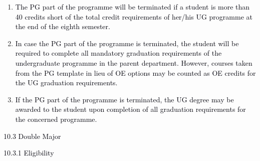 \documentclass[12pt]{article}
\begin{document}
\vspace{\baselineskip}
\begin{enumerate}
	\item {\fontsize{10pt}{12.0pt}\selectfont \textcolor[HTML]{00000A}{The PG part of the programme will be terminated if a student is more than 40 credits short of the total credit requirements of her/his UG programme at the end of the eighth semester.}\par}\par


\vspace{\baselineskip}
	\item {\fontsize{10pt}{12.0pt}\selectfont \textcolor[HTML]{00000A}{In case the PG part of the programme is terminated, the student will be required to complete all mandatory graduation requirements of the undergraduate programme in the parent department. However, courses taken from the PG template in lieu of OE options may be counted as OE credits for the UG graduation requirements.}\par}\par


\vspace{\baselineskip}
	\item {\fontsize{10pt}{12.0pt}\selectfont \textcolor[HTML]{00000A}{If the PG part of the programme is terminated, the UG degree may be awarded to the student upon completion of all graduation requirements for the concerned programme.}\par}
\end{enumerate}\par


\vspace{\baselineskip}
\textcolor[HTML]{00000A}{10.3 Double Major}\par


\vspace{\baselineskip}
{\fontsize{10pt}{12.0pt}\selectfont \textcolor[HTML]{00000A}{10.3.1 Eligibility}\par}\par
\end{document}

